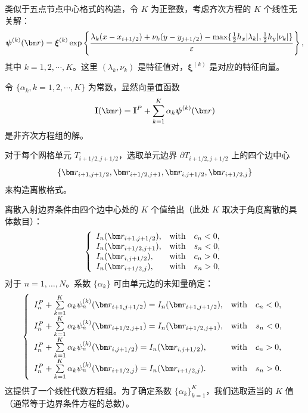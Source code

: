 类似于五点节点中心格式的构造，令 $K$ 为正整数，考虑齐次方程的 $K$ 个线性无关解：
\begin{equation}
    \boldsymbol{\psi}^{(k)}(\br)=\boldsymbol{\xi}^{(k)}\exp\left\{\frac{\lambda_{k}(x-x_{i+1/2})+\nu_{k}(y-y_{j+1/2})-\max\{\frac{1}{2}h_{x}|\lambda_{k}|,\frac{1}{2}h_{y}|\nu_{k}|\}}{\varepsilon}\right\},
\end{equation}
其中 $k=1,2,\cdots,K$。这里 $(\lambda_{k},\nu_{k})$ 是特征值对，$\boldsymbol{\xi}^{(k)}$ 是对应的特征向量。

令 $\{\alpha_{k},k=1,2,\cdots,K\}$ 为常数，显然向量值函数
\begin{equation}
    \mathbf{I}(\br)=\mathbf{I}^{P}+\sum_{k=1}^{K}\alpha_{k}\boldsymbol{\psi}^{(k)}(\br)
\end{equation}
是非齐次方程组的解。

对于每个网格单元 $T_{i+1/2,j+1/2}$，选取单元边界 $\partial T_{i+1/2,j+1/2}$ 上的四个边中心
\begin{equation}
    \{\br_{i+1,j+1/2},\br_{i+1/2,j+1},\br_{i,j+1/2},\br_{i+1/2,j}\}
\end{equation}
来构造离散格式。

离散入射边界条件由四个边中心处的 $K$ 个值给出（此处 $K$ 取决于角度离散的具体数目）：
\begin{equation}
    \left\{\begin{array}{lll}
        I_{n}(\br_{i+1,j+1/2}), & \text{with} & c_{n}<0, \\
        I_{n}(\br_{i+1/2,j+1}), & \text{with} & s_{n}<0, \\
        I_{n}(\br_{i,j+1/2}),   & \text{with} & c_{n}>0, \\
        I_{n}(\br_{i+1/2,j}),   & \text{with} & s_{n}>0,
    \end{array}\right.
\end{equation}
对于 $n=1,\dots,N$。系数 $\{\alpha_{k}\}$ 可由单元边的未知量确定：
\begin{equation}
    \left\{\begin{array}{lll}
        I^{P}_{n}+\sum\limits_{k=1}^{K}\alpha_{k}\psi^{(k)}_{n}(\br_{i+1,j+1/2})=I_{n}(\br_{i+1,j+1/2}), & \text{with} & c_{n}<0, \\
        I^{P}_{n}+\sum\limits_{k=1}^{K}\alpha_{k}\psi^{(k)}_{n}(\br_{i+1/2,j+1})=I_{n}(\br_{i+1/2,j+1}), & \text{with} & s_{n}<0, \\
        I^{P}_{n}+\sum\limits_{k=1}^{K}\alpha_{k}\psi^{(k)}_{n}(\br_{i,j+1/2})=I_{n}(\br_{i,j+1/2}),     & \text{with} & c_{n}>0, \\
        I^{P}_{n}+\sum\limits_{k=1}^{K}\alpha_{k}\psi^{(k)}_{n}(\br_{i+1/2,j})=I_{n}(\br_{i+1/2,j}).     & \text{with} & s_{n}>0.
    \end{array}\right.
\end{equation}
这提供了一个线性代数方程组。为了确定系数 $\{\alpha_{k}\}_{k=1}^{K}$，我们选取适当的 $K$ 值（通常等于边界条件方程的总数）。

